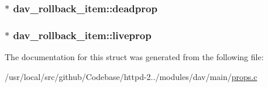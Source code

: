\subsubsection[{\texorpdfstring{deadprop}{deadprop}}]{$\ast$ dav\+\_\+rollback\+\_\+item\+::deadprop}\hypertarget{structdav__rollback__item_a7aa7214be00cef1a9e72db26237aa166}{}\label{structdav__rollback__item_a7aa7214be00cef1a9e72db26237aa166}
\subsubsection[{\texorpdfstring{liveprop}{liveprop}}]{$\ast$ dav\+\_\+rollback\+\_\+item\+::liveprop}\hypertarget{structdav__rollback__item_a2c330bd7bd664fc84b2a8fcbc2bcb61b}{}\label{structdav__rollback__item_a2c330bd7bd664fc84b2a8fcbc2bcb61b}


The documentation for this struct was generated from the following file\+:\begin{DoxyCompactItemize}
\item 
/usr/local/src/github/\+Codebase/httpd-\/2../modules/dav/main/\hyperlink{props_8c}{props.\+c}\end{DoxyCompactItemize}
